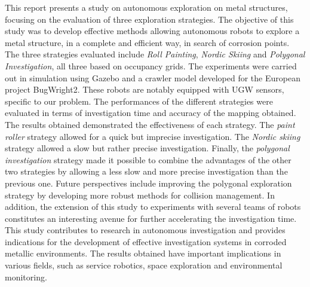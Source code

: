 
\begin{summary}

	This report presents a study on autonomous exploration on metal structures, focusing on the evaluation of three exploration strategies.
	The objective of this study was to develop effective methods allowing autonomous robots to explore a metal structure, in a complete and efficient way, in search of corrosion points.
	The three strategies evaluated include \textit{Roll Painting}, \textit{Nordic Skiing} and \textit{Polygonal Investigation}, all three based on occupancy grids.
	The experiments were carried out in simulation using Gazebo and a crawler model developed for the European project BugWright2.
	These robots are notably equipped with UGW sensors, specific to our problem.
	The performances of the different strategies were evaluated in terms of investigation time and accuracy of the mapping obtained.
	The results obtained demonstrated the effectiveness of each strategy.
	The \textit{paint roller} strategy allowed for a quick but imprecise investigation.
	The \textit{Nordic skiing} strategy allowed a slow but rather precise investigation.
	Finally, the \textit{polygonal investigation} strategy made it possible to combine the advantages of the other two strategies by allowing a less slow and more precise investigation than the previous one.
	Future perspectives include improving the polygonal exploration strategy by developing more robust methods for collision management.
	In addition, the extension of this study to experiments with several teams of robots constitutes an interesting avenue for further accelerating the investigation time.
	This study contributes to research in autonomous investigation and provides indications for the development of effective investigation systems in corroded metallic environments.
	The results obtained have important implications in various fields, such as service robotics, space exploration and environmental monitoring.

\end{summary}